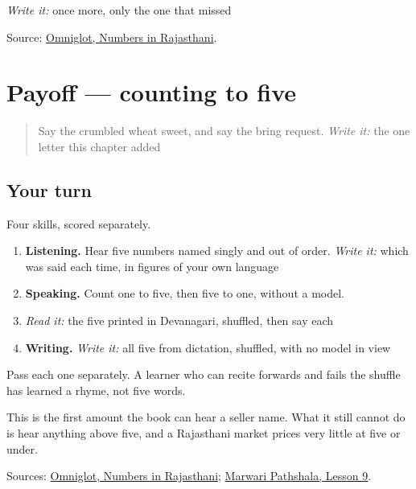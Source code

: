 \emph{Write it:} once more, only the one that missed

\begin{tcolorbox}[breakable,colback=teal!4,colframe=teal!35!black,title={Before you move on}]
Source: \href{https://www.omniglot.com/language/numbers/rajasthani.htm}{Omniglot, Numbers in Rajasthani}.
\end{tcolorbox}
\section[Practice]{Payoff — counting to five}

\label{lesson:MW-C32-count-five}



\begin{quote}
Say the crumbled wheat sweet, and say the bring request. \emph{Write it:} the one letter this chapter added
\end{quote}

\subsection*{Your turn}
Four skills, scored separately.

\begin{enumerate}
\raggedright
  \item \textbf{Listening.} Hear five numbers named singly and out of order. \emph{Write it:} which was said each time, in figures of your own language
  \item \textbf{Speaking.} Count one to five, then five to one, without a model.
  \item \emph{Read it:} the five printed in Devanagari, shuffled, then say each
  \item \textbf{Writing.} \emph{Write it:} all five from dictation, shuffled, with no model in view
\end{enumerate}

Pass each one separately. A learner who can recite forwards and fails the shuffle has learned a rhyme, not five words.

This is the first amount the book can hear a seller name. What it still cannot do is hear anything above five, and a Rajasthani market prices very little at five or under.

\begin{tcolorbox}[breakable,colback=teal!4,colframe=teal!35!black,title={Before you move on}]
Sources: \href{https://www.omniglot.com/language/numbers/rajasthani.htm}{Omniglot, Numbers in Rajasthani}; \href{https://www.marwaripathshala.com/marwari-lesson-9-english}{Marwari Pathshala, Lesson 9}.
\end{tcolorbox}
